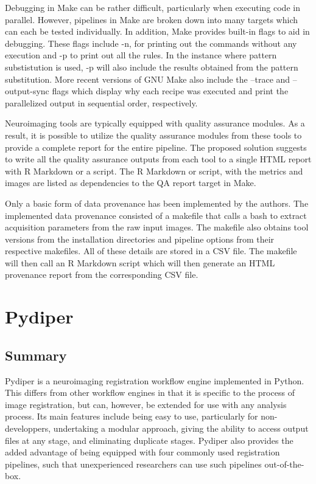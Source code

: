 \documentclass{report}
\begin{document}
    Debugging in Make can be rather difficult, particularly when executing code
in parallel. However, pipelines in Make are broken down into many targets which
can each be tested individually. In addition, Make provides built-in flags to
aid in debugging. These flags include -n, for printing out the commands without
any execution and -p to print out all the rules. In the instance where pattern
substistution is used, -p will also include the results obtained from the
pattern substitution. More recent versions of GNU Make also include the --trace
and --output-sync flags which display why each recipe was executed and print the
parallelized output in sequential order, respectively.


    Neuroimaging tools are typically equipped with quality assurance modules. As
a result, it is possible to utilize the quality assurance modules from these
tools to provide a complete report for the entire pipeline. The proposed
solution suggests to write all the quality assurance outputs from each tool to a single HTML
report with R Markdown or a script. The R Markdown or script, with the metrics
and images are listed as dependencies to the QA report target in Make.


    Only a basic form of data provenance has been implemented by the authors.
The implemented data provenance consisted of a makefile that calls a bash to
extract acquisition parameters from the raw input images. The makefile also
obtains tool versions from the installation directories and pipeline options
from their respective makefiles. All of these details are stored in a CSV file.
The makefile will then call an R Markdown script which will then generate an
HTML provenance report from the corresponding CSV file.

    

          
    \section{Pydiper}
        \subsection{Summary}

        Pydiper is a neuroimaging registration workflow engine implemented in
Python. This differs from other workflow engines in that it is specific to the
process of image registration, but can, however, be extended for use with any
analysis process. Its main features include being easy to use, particularly for
non-developpers, undertaking a modular approach, giving the ability to access
output files at any stage, and eliminating duplicate stages. Pydiper also
provides the added advantage of being equipped with four commonly used
registration pipelines, such that unexperienced researchers can use such
pipelines out-of-the-box. 
\end{document}
